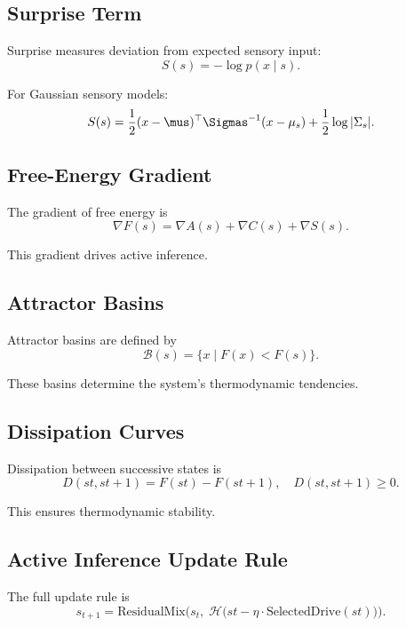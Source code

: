 \subsection{Surprise Term}

Surprise measures deviation from expected sensory input:
\[
S(s) = -\log p(x \mid s).
\]

For Gaussian sensory models:
\[
S(s) =
\frac{1}{2} (x - \mus)^\top \Sigmas^{-1} (x - \mu_s)
+ \frac{1}{2} \log |\Sigma_s|.
\]

\subsection{Free-Energy Gradient}

The gradient of free energy is
\[
\nabla F(s) =
\nabla A(s) +
\nabla C(s) +
\nabla S(s).
\]

This gradient drives active inference.

\subsection{Attractor Basins}

Attractor basins are defined by
\[
\mathcal{B}(s) = \{ x \mid F(x) < F(s) \}.
\]

These basins determine the system’s thermodynamic tendencies.

\subsection{Dissipation Curves}

Dissipation between successive states is
\[
D(st, s{t+1}) = F(st) - F(s{t+1}),
\quad D(st, s{t+1}) \ge 0.
\]

This ensures thermodynamic stability.

\subsection{Active Inference Update Rule}

The full update rule is
\[
s_{t+1} =
\mathrm{ResidualMix}\Big(
    s_t,\;
    \mathcal{H}\big(
        st - \eta \cdot \mathrm{SelectedDrive}(st)
    \big)
\Big).
\]

